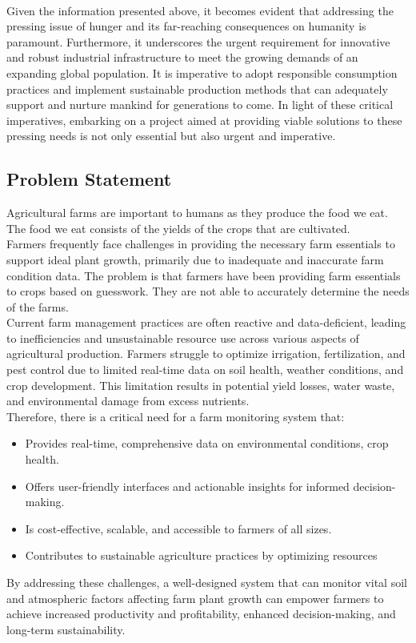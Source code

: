 \documentclass[12pt, a4paper]{article}
\begin{document}
\\
Given the information presented above, it becomes evident that addressing the pressing issue of hunger and its far-reaching consequences on humanity is paramount. Furthermore, it underscores the urgent requirement for innovative and robust industrial infrastructure to meet the growing demands of an expanding global population. It is imperative to adopt responsible consumption practices and implement sustainable production methods that can adequately support and nurture mankind for generations to come. In light of these critical imperatives, embarking on a project aimed at providing viable solutions to these pressing needs is not only essential but also urgent and imperative.

\newpage
\subsection{Problem Statement}
Agricultural farms are important to humans as they produce the food we eat. The food we eat consists of the yields of the crops that are cultivated.\\ 
Farmers frequently face challenges in providing the necessary farm essentials to support ideal plant growth, primarily due to inadequate and inaccurate farm condition data. The problem is that farmers have been providing farm essentials to crops based on guesswork. They are not able to accurately determine the needs of the farms.
\\
Current farm management practices are often reactive and data-deficient, leading to inefficiencies and unsustainable resource use across various aspects of agricultural production. Farmers struggle to optimize irrigation, fertilization, and pest control due to limited real-time data on soil health, weather conditions, and crop development. This limitation results in potential yield losses, water waste, and environmental damage from excess nutrients.
\\
Therefore, there is a critical need for a farm monitoring system that:
\begin{itemize}
 \item Provides real-time, comprehensive data on environmental conditions, crop health.
 \item Offers user-friendly interfaces and actionable insights for informed decision-making.
 \item Is cost-effective, scalable, and accessible to farmers of all sizes.
 \item Contributes to sustainable agriculture practices by optimizing resources
\end{itemize}
By addressing these challenges, a well-designed system that can monitor vital soil and atmospheric factors affecting farm plant growth can empower farmers to achieve increased productivity and profitability, enhanced decision-making, and long-term sustainability.
\end{document}
